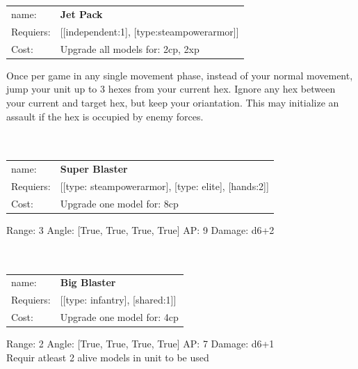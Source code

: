 \ \\
\ \\
\begin{tabular}{ll}
name: & {\bf Jet Pack } \\
Requiers: & [[independent:1], [type:steampowerarmor]] \\
Cost: & Upgrade all models for: 2cp, 2xp \\
\end{tabular}

Once per game in any single movement phase, instead of your normal movement, jump your unit up to 3 hexes from your current hex. Ignore any hex between your current and target hex, but keep your oriantation. This may initialize an assault if the hex is occupied by enemy forces.\\ 









\ \\
\ \\
\begin{tabular}{ll}
name: & {\bf Super Blaster } \\
Requiers: & [[type: steampowerarmor], [type: elite], [hands:2]] \\
Cost: & Upgrade one model for: 8cp \\
\end{tabular}



Range: 3  Angle: [True, True, True, True] AP: 9 Damage: d6+2 \\








\ \\
\ \\
\begin{tabular}{ll}
name: & {\bf Big Blaster } \\
Requiers: & [[type: infantry], [shared:1]] \\
Cost: & Upgrade one model for: 4cp \\
\end{tabular}



Range: 2  Angle: [True, True, True, True] AP: 7 Damage: d6+1 \\
Requir atleast 2 alive models in unit to be used\\ 








